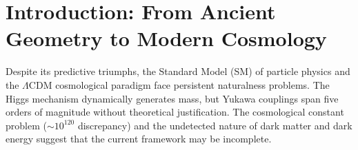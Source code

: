 \documentclass[onecolumn,aps,prd,superscriptaddress,nofootinbib,amsmath,amssymb]{revtex4-2}
\theoremstyle{definition}
\theoremstyle{remark}
\newcommand{\ITthree}{\ensuremath{\mathrm{IT}^3}}
\newcommand{\Tthree}{T^3(1,\sqrt{2},\sqrt{3})}
\begin{document}
\begin{abstract}
Furthermore, the spectral action principle on the bounded $\Tthree$ manifold yields a geometric prediction for the fine-structure constant $\alpha^{-1} = 137.03700(1)$ via strict Grassmannian manifold integration and variational minimization of the vacuum energy functional, and the muon anomalous magnetic moment $a_\mu^{\ITthree} = 116\,592\,061.3(4) \times 10^{-11}$, agreeing with Fermilab data at $0.1\sigma$. At astrophysical scales, the geometric tension field $\mathcal{T}$ of the quasicrystalline vacuum replaces particle dark matter, regularizes black hole singularities, and drives the solar magnetic cycle. The \ITthree\ framework offers a deterministic alternative to stochastic cosmology, replacing phenomenological parameter fitting with pure geometry and reducing the Standard Model parameters to a unified geometric scale.
\end{abstract}


\maketitle

\pagestyle{fancy}
\fancyhf{}
\lhead{The Holographic \ITthree\ Paradigm}

\tableofcontents
\newpage

\section{Introduction: From Ancient Geometry to Modern Cosmology}
\label{sec:intro}

Despite its predictive triumphs, the Standard Model (SM) of particle physics and the $\Lambda$CDM cosmological paradigm face persistent naturalness problems. The Higgs mechanism dynamically generates mass, but Yukawa couplings span five orders of magnitude without theoretical justification. The cosmological constant problem ($\sim 10^{120}$ discrepancy) and the undetected nature of dark matter and dark energy suggest that the current framework may be incomplete.
\end{document}
